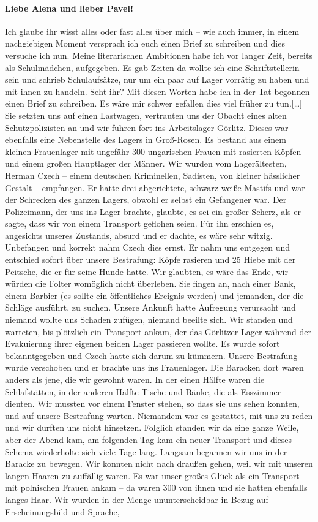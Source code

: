 \documentclass[a4paper,12pt,ngerman,
]{nisebook}
\begin{document}
\paragraph{Liebe Alena und lieber Pavel!}
Ich glaube ihr wisst alles oder fast alles über mich -- wie auch immer, in einem nachgiebigen Moment versprach ich euch einen Brief zu schreiben und dies versuche ich nun. Meine literarischen Ambitionen habe ich vor langer Zeit, bereits als Schulmädchen, aufgegeben. Es gab Zeiten da wollte ich eine Schriftstellerin sein und schrieb Schulaufsätze, nur um ein paar auf Lager vorrätig zu haben und mit ihnen zu handeln. Seht ihr? Mit diesen Worten habe ich in der Tat begonnen einen Brief zu schreiben. Es wäre mir schwer gefallen dies viel früher zu tun.[\dots]
Sie setzten uns auf einen Lastwagen, vertrauten uns der Obacht eines alten Schutzpolizisten an und wir fuhren fort ins Arbeitslager Görlitz. Dieses war ebenfalls eine Nebenstelle des Lagers in Groß-Rosen. Es bestand aus einem kleinen Frauenlager mit ungefähr 300 ungarischen Frauen mit rasierten Köpfen und einem großen Hauptlager der Männer. Wir wurden vom Lagerältesten, Herman Czech -- einem deutschen Kriminellen, Sadisten, von kleiner hässlicher Gestalt -- empfangen. Er hatte drei abgerichtete, schwarz-weiße Mastifs und war der Schrecken des ganzen Lagers, obwohl er selbst ein Gefangener war. Der Polizeimann, der uns ins Lager brachte, glaubte, es sei ein großer Scherz, als er sagte, dass wir von einem Transport geflohen seien. Für ihn erschien es, angesichts unseres Zustands, absurd und er dachte, es wäre sehr witzig. Unbefangen und korrekt nahm Czech dies ernst. Er nahm uns entgegen und entschied sofort über unsere Bestrafung: Köpfe rasieren und 25 Hiebe mit der Peitsche, die er für seine Hunde hatte. Wir glaubten, es wäre das Ende, wir würden die Folter womöglich nicht überleben. Sie fingen an, nach einer Bank, einem Barbier (es sollte ein öffentliches Ereignis werden) und jemanden, der die Schläge ausführt, zu suchen. Unsere Ankunft hatte Aufregung verursacht und niemand wollte uns Schaden zufügen, niemand beeilte sich. Wir standen und warteten, bis plötzlich ein Transport ankam, der das Görlitzer Lager während der Evakuierung ihrer eigenen beiden Lager passieren wollte. Es wurde sofort bekanntgegeben und Czech hatte sich darum zu kümmern. Unsere Bestrafung wurde verschoben und er brachte uns ins Frauenlager. Die Baracken dort waren anders als jene, die wir gewohnt waren. In der einen Hälfte waren die Schlafstätten, in der anderen Hälfte Tische und Bänke, die als Esszimmer dienten. Wir mussten vor einem Fenster stehen, so dass sie uns sehen konnten, und auf unsere Bestrafung warten. Niemandem war es gestattet, mit uns zu reden und wir durften uns nicht hinsetzen. Folglich standen wir da eine ganze Weile, aber der Abend kam, am folgenden Tag kam ein neuer Transport und dieses Schema wiederholte sich viele Tage lang. Langsam begannen wir uns in der Baracke zu bewegen. Wir konnten nicht nach draußen gehen, weil wir mit unseren langen Haaren zu auffällig waren. Es war unser großes Glück als ein Transport mit polnischen Frauen ankam -- da waren 300 von ihnen und sie hatten ebenfalls langes Haar. Wir wurden in der Menge ununterscheidbar in Bezug auf Erscheinungsbild und Sprache, 
\end{document}
